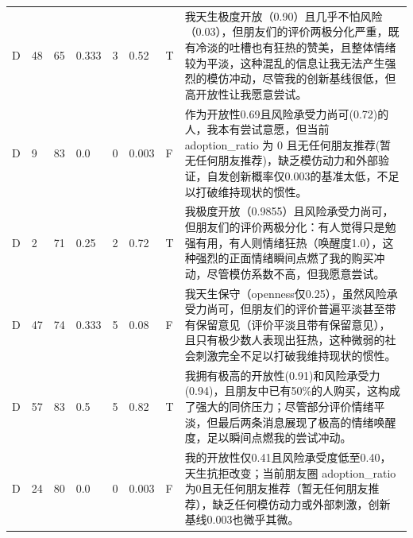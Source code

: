 \begin{longtable}{P{0.05\textwidth}P{0.05\textwidth}P{0.07\textwidth}P{0.08\textwidth}P{0.06\textwidth}P{0.06\textwidth}P{0.06\textwidth}P{0.45\textwidth}}
D & 48 & 65 & 0.333 & 3 & 0.52 & T & 我天生极度开放（0.90）且几乎不怕风险（0.03），但朋友们的评价两极分化严重，既有冷淡的吐槽也有狂热的赞美，且整体情绪较为平淡，这种混乱的信息让我无法产生强烈的模仿冲动，尽管我的创新基线很低，但高开放性让我愿意尝试。 \\
D & 9 & 83 & 0.0 & 0 & 0.003 & F & 作为开放性0.69且风险承受力尚可(0.72)的人，我本有尝试意愿，但当前 adoption\_ratio 为 0 且无任何朋友推荐(暂无任何朋友推荐)，缺乏模仿动力和外部验证，自发创新概率仅0.003的基准太低，不足以打破维持现状的惯性。 \\
D & 2 & 71 & 0.25 & 2 & 0.72 & T & 我极度开放（0.9855）且风险承受力尚可，但朋友们的评价两极分化：有人觉得只是勉强有用，有人则情绪狂热（唤醒度1.0），这种强烈的正面情绪瞬间点燃了我的购买冲动，尽管模仿系数不高，但我愿意尝试。 \\
D & 47 & 74 & 0.333 & 5 & 0.08 & F & 我天生保守（openness仅0.25），虽然风险承受力尚可，但朋友们的评价普遍平淡甚至带有保留意见（评价平淡且带有保留意见），且只有极少数人表现出狂热，这种微弱的社会刺激完全不足以打破我维持现状的惯性。 \\
D & 57 & 83 & 0.5 & 5 & 0.82 & T & 我拥有极高的开放性(0.91)和风险承受力(0.94)，且朋友中已有50\%的人购买，这构成了强大的同侪压力；尽管部分评价情绪平淡，但最后两条消息展现了极高的情绪唤醒度，足以瞬间点燃我的尝试冲动。 \\
D & 24 & 80 & 0.0 & 0 & 0.003 & F & 我的开放性仅0.41且风险承受度低至0.40，天生抗拒改变；当前朋友圈 adoption\_ratio 为0且无任何朋友推荐（暂无任何朋友推荐），缺乏任何模仿动力或外部刺激，创新基线0.003也微乎其微。 \\
\end{longtable}
